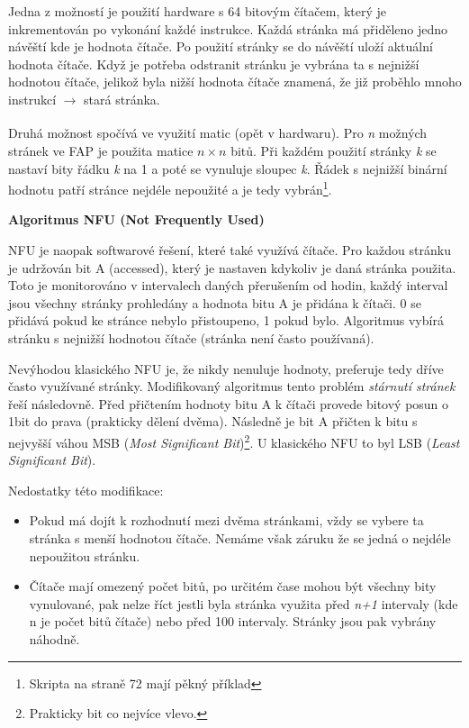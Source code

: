\vspace{0,5cm}

Jedna z možností je použití hardware s 64 bitovým čítačem, který je inkrementován po vykonání každé instrukce. Každá stránka má přiděleno jedno návěští kde je hodnota čítače. Po použití stránky se do návěští uloží aktuální hodnota čítače. Když je potřeba odstranit stránku je vybrána ta s nejnižší hodnotou čítače, jelikož byla nižší hodnota čítače znamená, že již proběhlo mnoho instrukcí $\xrightarrow[]{}$ stará stránka. 

\newpage

Druhá možnost spočívá ve využití matic (opět v hardwaru). Pro \textit{n} možných stránek ve FAP je použita matice $n \times n$ bitů. Při každém použití stránky \textit{k} se nastaví bity řádku \textit{k} na 1 a poté se vynuluje sloupec \textit{k}. Řádek s nejnižší binární hodnotu patří stránce nejdéle nepoužité a je tedy vybrán\footnote{Skripta na straně 72 mají pěkný příklad}. 

\begin{Large}
    \vspace{0,5cm}
    \textbf{Algoritmus NFU (Not Frequently Used)}
\end{Large}

NFU je naopak softwarové řešení, které také využívá čítače. Pro každou stránku je udržován bit A (accessed), který je nastaven kdykoliv je daná stránka použita. Toto je monitorováno v intervalech daných přerušením od hodin, každý interval jsou všechny stránky prohledány a hodnota bitu A je přidána k čítači.  0 se přidává pokud ke stránce nebylo přistoupeno, 1 pokud bylo. Algoritmus vybírá stránku s nejnižší hodnotou čítače (stránka není často používaná). 

\vspace{0,5cm}

Nevýhodou klasického NFU je, že nikdy nenuluje hodnoty, preferuje tedy dříve často využívané stránky. Modifikovaný algoritmus tento problém \textit{stárnutí stránek} řeší následovně. Před přičtením hodnoty bitu A k čítači provede bitový posun o 1bit do prava (prakticky dělení dvěma). Následně je bit A přičten k bitu s nejvyšší váhou MSB (\textit{Most Significant Bit})\footnote{Prakticky bit co nejvíce vlevo.}. U klasického NFU to byl LSB (\textit{Least Significant Bit}). 

\vspace{0,5cm}

Nedostatky této modifikace:

\begin{itemize}
    \item Pokud má dojít k rozhodnutí mezi dvěma stránkami, vždy se vybere ta stránka s menší hodnotou čítače. Nemáme však záruku že se jedná o nejdéle nepoužitou stránku. 
    \item Čítače mají omezený počet bitů, po určitém čase mohou být všechny bity vynulované, pak nelze říct jestli byla stránka využita před \textit{n+1} intervaly (kde n je počet bitů čítače) nebo před 100 intervaly. Stránky jsou pak vybrány náhodně. 
\end{itemize} 

